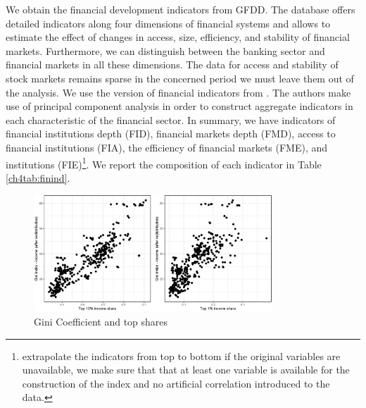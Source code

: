 \begin{refsection}
  We obtain the financial development indicators from \ac{GFDD}. The database offers detailed indicators along four dimensions of financial systems and allows to estimate the effect of changes in access, size, efficiency, and stability of financial markets. Furthermore, we can distinguish between the banking sector and financial markets in all these dimensions. The data for access and stability of stock markets remains sparse in the concerned period we must leave them out of the analysis. We use the version of financial indicators from \textcite{svirydzenka2016introducing}. The authors make use of principal component analysis in order to construct aggregate indicators in each characteristic of the financial sector. In summary, we have indicators of financial institutions depth (FID), financial markets depth (FMD), access to financial institutions (FIA), the efficiency of financial markets (FME), and institutions (FIE)\footnote{\textcite{svirydzenka2016introducing} extrapolate the indicators from top to bottom if the original variables are unavailable, we make sure that that at least one variable is available for the construction of the index and no artificial correlation introduced to the data.}. We report the composition of each indicator in Table \ref{ch4tab:finind}. 

\begin{figure}[ht!]
  \caption{Gini Coefficient and top shares}
  \label{ch4fig:gini_topshares}
  \centering
  \includegraphics[width=0.8\textwidth, keepaspectratio]{figures/ch4/plots_ineq}
\end{figure}



\end{refsection}
